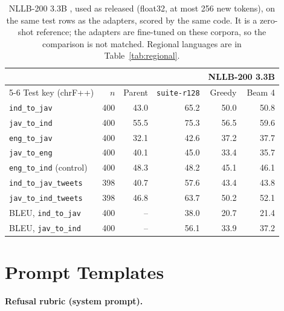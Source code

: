 \documentclass[11pt]{article}
\newcommand{\run}[1]{\texttt{#1}}
\begin{document}
\begin{table}[t]
\centering\footnotesize
\begin{minipage}[c]{0.6\textwidth}
\centering
\setlength{\tabcolsep}{4pt}
\begin{tabular}{lrrrrr}
\toprule
& & & & \multicolumn{2}{c}{NLLB-200 3.3B} \\
\cmidrule(lr){5-6}
Test key (chrF++) & $n$ & Parent & \run{suite-r128} & Greedy & Beam 4 \\
\midrule
\texttt{ind\_to\_jav} & 400 & 43.0 & 65.2 & 50.0 & 50.8 \\
\texttt{jav\_to\_ind} & 400 & 55.5 & 75.3 & 56.5 & 59.6 \\
\texttt{eng\_to\_jav} & 400 & 32.1 & 42.6 & 37.2 & 37.7 \\
\texttt{jav\_to\_eng} & 400 & 40.1 & 45.0 & 33.4 & 35.7 \\
\texttt{eng\_to\_ind} (control) & 400 & 48.3 & 48.2 & 45.1 & 46.1 \\
\texttt{ind\_to\_jav\_tweets} & 398 & 40.7 & 57.6 & 43.4 & 43.8 \\
\texttt{jav\_to\_ind\_tweets} & 398 & 46.8 & 63.7 & 50.2 & 52.1 \\
BLEU, \texttt{ind\_to\_jav} & 400 & -- & 38.0 & 20.7 & 21.4 \\
BLEU, \texttt{jav\_to\_ind} & 400 & -- & 56.1 & 33.9 & 37.2 \\
\bottomrule
\end{tabular}
\end{minipage}\hfill
\begin{minipage}[c]{0.37\textwidth}
\caption{NLLB-200 3.3B \citep{nllb2022}, used as released (float32, at most 256 new tokens), on the same test
rows as the adapters, scored by the same code. It is a zero-shot reference; the adapters are fine-tuned on these
corpora, so the comparison is not matched. Regional languages are in Table~\ref{tab:regional}.}
\label{tab:nllb}
\end{minipage}
\end{table}

\section{Prompt Templates}\label{app:prompts}

\noindent\textbf{Refusal rubric (system prompt).}
\end{document}
